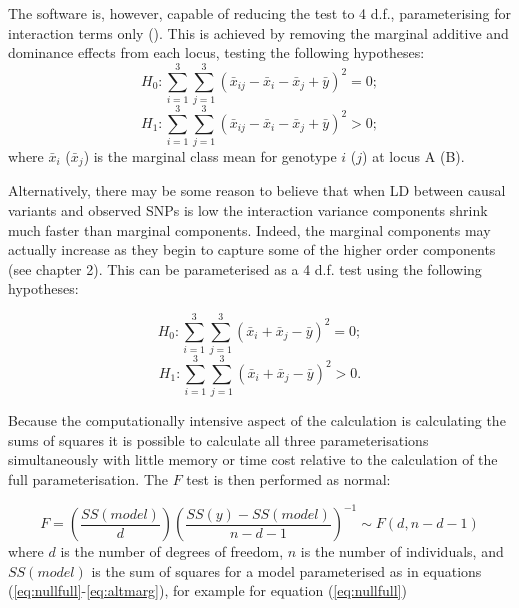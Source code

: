 The software is, however, capable of reducing the test to 4 d.f., parameterising for interaction terms only (\citealp{Cordell2002}). This is achieved by removing the marginal additive and dominance effects from each locus, testing the following hypotheses:
\begin{equation}
H_{0}: \sum_{i=1}^{3}\sum_{j=1}^{3} (\bar{x}_{ij} - \bar{x}_{i} - \bar{x}_{j} + \bar{y})^{2} = 0; \label{eq:nullint}
\end{equation}
\begin{equation}
H_{1}: \sum_{i=1}^{3}\sum_{j=1}^{3} (\bar{x}_{ij} - \bar{x}_{i} - \bar{x}_{j} + \bar{y})^{2} > 0; \label{eq:altint}
\end{equation} where $\bar{x}_i$ ($\bar{x}_j$) is the marginal class mean for genotype $i$ ($j$) at locus A (B).

Alternatively, there may be some reason to believe that when LD between causal variants and observed SNPs is low the interaction variance components shrink much faster than marginal components. Indeed, the marginal components may actually increase as they begin to capture some of the higher order components (see chapter 2). This can be parameterised as a 4 d.f. test using the following hypotheses:

\begin{equation}
H_{0}: \sum_{i=1}^{3}\sum_{j=1}^{3} (\bar{x}_{i} + \bar{x}_{j} - \bar{y})^{2} = 0; \label{eq:nullmarg}
\end{equation}
\begin{equation}
H_{1}: \sum_{i=1}^{3}\sum_{j=1}^{3} (\bar{x}_{i} + \bar{x}_{j} - \bar{y})^{2} > 0. \label{eq:altmarg}
\end{equation}

Because the computationally intensive aspect of the calculation is calculating the sums of squares it is possible to calculate all three parameterisations simultaneously with little memory or time cost relative to the calculation of the full parameterisation. The $F$ test is then performed as normal:

\begin{equation}
\label{eq:ftest}
F = \left(\frac{SS(model)}{d}\right)\left(\frac{SS(y) - SS(model)}{n-d-1}\right)^{-1} \sim F(d,n-d-1)
\end{equation}
where $d$ is the number of degrees of freedom, $n$ is the number of individuals, and $SS(model)$ is the sum of squares for a model parameterised as in equations (\ref{eq:nullfull}-\ref{eq:altmarg}), for example for equation (\ref{eq:nullfull})

